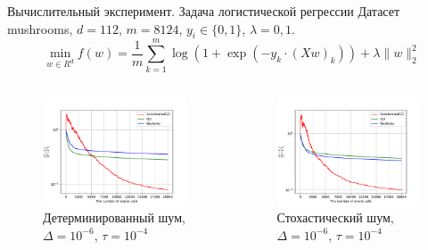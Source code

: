 \documentclass{beamer}
\begin{document}
\begin{frame}{Вычислительный эксперимент. Задача логистической регрессии}
Датасет mushrooms, $d = 112$, $m = 8124$, $y_i \in \{0, 1\}$, $\lambda = 0,1$.
$$ \min\limits_{w \in R^d} f(w) = \frac{1}{m}\sum\limits_{k = 1}^m \log(1 + \exp(-y_k \cdot (Xw)_k)) + \lambda \|w\|_2^2$$
\begin{columns}[c]
    \begin{figure}
    \includegraphics[width=1.0\textwidth]{Deterministic_quadratic_AGD_GD_Nesterov_18.pdf}
        \caption*{Детерминированный шум, $\Delta = 10^{-6}$, $\tau = 10^{-4}$}
    \end{figure}

    \begin{figure}
    \includegraphics[width=1.0\textwidth]{Stochastic_quadratic_AGD_GD_Nesterov_18.pdf}
        \caption*{Стохастический шум, $\Delta = 10^{-6}$, $\tau = 10^{-4}$}
    \end{figure}
\end{columns}
\end{frame}
\end{document}

